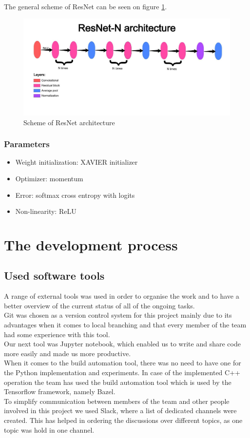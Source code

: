 \documentclass[licencjacka]{pracamgr}
\begin{document}
		The general scheme of ResNet can be seen on figure \ref{fig:666}.
		\begin{figure}[h]
		\caption{Scheme of ResNet architecture}
		\label{fig:666}
				\centering
				\includegraphics[width=\textwidth]{images/resnet}
		\end{figure}
		\subsection{Parameters}
			\begin{itemize}
 			\item Weight initialization: XAVIER initializer
 			\item Optimizer: momentum 
 			\item Error: softmax cross entropy with logits
 			\item Non-linearity: ReLU
			\end{itemize}

\chapter{The development process}

	\section{Used software tools}
	A range of external tools was used in order to organise the work and to have a better overview of the current status of all of the ongoing tasks.
\\
	Git was chosen as a version control system for this project mainly due to its advantages when it comes to local branching and that every member of the team had some experience with this tool.
\\
	Our next tool was Jupyter notebook, which enabled us to write and share code more easily and made us more productive. 
\\
	When it comes to the build automation tool, there was no need to have one for the Python implementation and experiments. In case of the implemented C++ operation the team has used the build automation tool which is used by the Tensorflow framework, namely Bazel.	
\\
	To simplify communication between members of the team and other people involved in this project we used Slack, where a list of dedicated channels were created. This has helped in ordering the discussions over different topics, as one topic was hold in one channel.
\end{document}
